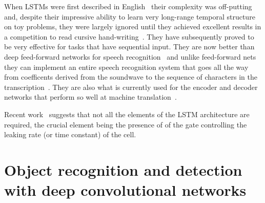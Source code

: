 \documentclass[]{article}
\begin{document}
When LSTMs were first described in
English~\cite{Hochreiter+Schmidhuber-1997} their complexity was off-putting
and, despite their impressive ability to learn very long-range temporal
structure on toy problems, they were largely ignored until they achieved
excellent results in a competition to read cursive
hand-writing~\cite{Graves}. They have subsequently proved to be very
effective for tasks that have sequential input.  They are now better than
deep feed-forward networks for speech recognition~\cite{gravestimit} and
unlike feed-forward nets they can implement an entire speech recognition
system that goes all the way from coefficents derived from the soundwave to
the sequence of characters in the transcription~\cite{gravestimit}.  They
are also what is currently used for the encoder and decoder networks that
perform so well at machine
translation~\citep{Bahdanau-et-al-arxiv2014,Sutskever-et-al-NIPS2014}.

Recent work~\citep{Chung-et-al-NIPSDL2014} suggests that not all the elements of the LSTM
architecture are required, the crucial element being the presence of
of the gate controlling the leaking rate (or time constant) of the cell.


\section{Object recognition and detection with deep convolutional networks}
\end{document}
